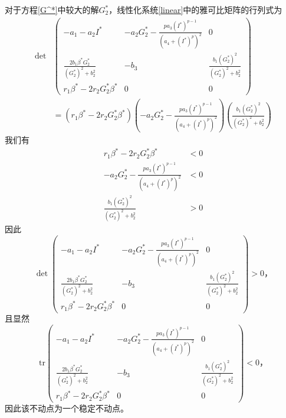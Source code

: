 对于方程\ref{G^*}中较大的解$G_2^*$，线性化系统\ref{linear}中的雅可比矩阵的行列式为
\begin{equation}
    \begin{aligned}
        \det&\begin{pmatrix}
            -a_1-a_2I^*                                & -a_2G_2^*-\frac{pa_3(I^*)^{p-1}}{(a_4+(I^*)^p)^2} & 0                                      \\
            \frac{2b_1\beta^*G_2^*}{(G_2^*)^2 + b_2^2} & -b_3                                              & \frac{b_1(G_2^*)^2}{(G_2^*)^2 + b_2^2} \\
            r_1\beta^*-2r_2G_2^*\beta^*                & 0                                                 & 0
        \end{pmatrix}\\
        &=(r_1\beta^*-2r_2G_2^*\beta^*)(-a_2G_2^*-\frac{pa_3(I^*)^{p-1}}{(a_4+(I^*)^p)^2})( \frac{b_1(G_2^*)^2}{(G_2^*)^2 + b_2^2})
    \end{aligned}
\end{equation}
我们有
\begin{equation}
    \begin{aligned}
        r_1\beta^*-2r_2G_2^*\beta^*                       & <0 \\
        -a_2G_2^*-\frac{pa_3(I^*)^{p-1}}{(a_4+(I^*)^p)^2} & <0 \\
        \frac{b_1(G_2^*)^2}{(G_2^*)^2 + b_2^2}            & >0
    \end{aligned}
\end{equation}
因此
\begin{equation}
    \det \begin{pmatrix}
        -a_1-a_2I^*                                & -a_2G_2^*-\frac{pa_3(I^*)^{p-1}}{(a_4+(I^*)^p)^2} & 0                                      \\
        \frac{2b_1\beta^*G_2^*}{(G_2^*)^2 + b_2^2} & -b_3                                              & \frac{b_1(G_2^*)^2}{(G_2^*)^2 + b_2^2} \\
        r_1\beta^*-2r_2G_2^*\beta^*                & 0                                                 & 0
    \end{pmatrix}>0，
\end{equation}
且显然
    \begin{equation}
        \text{tr}\begin{pmatrix}
            -a_1-a_2I^*                                & -a_2G_2^*-\frac{pa_3(I^*)^{p-1}}{(a_4+(I^*)^p)^2} & 0                                      \\
            \frac{2b_1\beta^*G_2^*}{(G_2^*)^2 + b_2^2} & -b_3                                              & \frac{b_1(G_2^*)^2}{(G_2^*)^2 + b_2^2} \\
            r_1\beta^*-2r_2G_2^*\beta^*                & 0                                                 & 0
        \end{pmatrix}<0，
    \end{equation}
    因此该不动点为一个稳定不动点。
    
